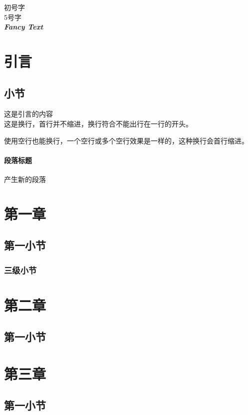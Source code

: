 \documentclass[]{ctexart}
\newcommand{\mycommend}{\textit{\textbf{\textsf{Fancy Text}}}}
\begin{document}
	 初号字 \\
	 5号字   \\
	
	\mycommend
	
	\tableofcontents

	\section*{引言}
	\subsection*{小节}
	这是引言的内容\\ 这是换行，首行并不缩进，换行符合不能出行在一行的开头。
	
	使用空行也能换行，一个空行或多个空行效果是一样的，这种换行会首行缩进。
	
	\paragraph{段落标题} 产生新的段落
	
	\section{第一章}
	\subsection{第一小节}
	\subsubsection{三级小节}
	
	\section{第二章}
	\subsection{第一小节}
	
	\section{第三章}
	\subsection{第一小节}
	
\end{document}
